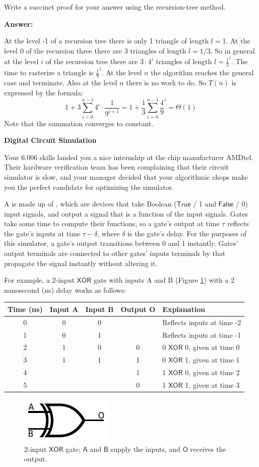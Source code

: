 \documentclass[12pt,twoside]{article}
\newcommand{\answer}{
 \par\medskip
 \textbf{Answer:}
}
\newcommand{\answerIu}{ \answer
At the level -1 of a recursion tree there is only 1 triangle 
of length $l=1$.
At the level $0$ of the recursion three there are 3 triangles of length $l=1/3$.
So in general at the level $i$ of the recursion tree there are $3\cdot4^i$ triangles of length $l=\frac{1}{3}^i$.
The time to rasterize a triangle is $\frac{1}{9}^i$. At the level $n$ the algorithm reaches the general case and terminate.
Also at the level $n$ there is no work to do. So $T(n)$ is expressed by the formula:
$$1+3\sum_{i=0}^{n-1}4^i\cdot\frac{1}{9^{i+1}}=1+\frac{1}{3}\sum_{i=0}^{n-1}\frac{4}{9}^i=\Theta(1)$$
Note that the summation converges to constant.
}
\begin{document}
\begin{problems}
\begin{problemparts}
  \problempart {} Write a succinct proof for your answer using the  
  recursion-tree method.
  \answerIu
\end{problemparts}



\problem {} \textbf{Digital Circuit Simulation}

Your 6.006 skills landed you a nice internship at the chip manufacturer AMDtel.
Their hardware verification team has been complaining that their circuit
simulator is slow, and your manager decided that your algorithmic chops make
you the perfect candidate for optimizing the simulator.

A  is made up of , which are devices that take Boolean
($\mathsf{True}$ / 1 and $\mathsf{False}$ / 0) input signals, and output a
signal that is a function of the input signals. Gates take some time to compute
their functions, so a gate's output at time $\tau$ reflects the gate's inputs at
time $\tau - \delta$, where $\delta$ is the gate's delay. For the purposes of
this simulator, a gate's output transitions between 0 and 1 instantly. Gates'
output terminals are connected to other gates' inputs terminals by 
that propagate the signal instantly without altering it.

For example, a 2-input $\mathsf{XOR}$ gate with inputs A and B (Figure
\ref{fig:xor}) with a 2 nanosecond (ns) delay works as follows: 

\begin{center}
\begin{tabular}{|c|c|c|c|l|}
\hline
Time (ns) & Input A & Input B & Output O & Explanation \\
\hline
0 & 0 & 0 &   & Reflects inputs at time -2 \\ 
1 & 0 & 1 &   & Reflects inputs at time -1 \\ 
2 & 1 & 0 & 0 & 0 $\mathsf{XOR}$ 0, given at time 0 \\
3 & 1 & 1 & 1 & 0 $\mathsf{XOR}$ 1, given at time 1 \\
4 &   &   & 1 & 1 $\mathsf{XOR}$ 0, given at time 2 \\
5 &   &   & 0 & 1 $\mathsf{XOR}$ 1, given at time 3 \\
\hline
\end{tabular}
\end{center}

\begin{figure}[htbp]
\centering
\includegraphics{figures/xor-ansi}
\caption{2-input $\mathsf{XOR}$ gate; $\mathsf{A}$ and $\mathsf{B}$ supply the
inputs, and $\mathsf{O}$ receives the output.}
\label{fig:xor}
\end{figure}  


\end{problems}
\end{document}
